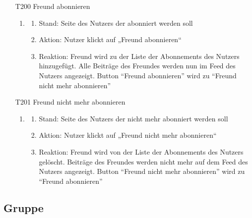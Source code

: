 \documentclass[parskip=full]{scrartcl}
\begin{document}
	\begin{itemize}
		\item[T200] Freund abonnieren
		\begin{enumerate}
			\item
			\begin{enumerate}[nosep]	
				\item Stand: Seite des Nutzers der abonniert werden soll
				\item Aktion: Nutzer klickt auf „Freund abonnieren“
				\item Reaktion: Freund wird zu der Liste der \gls{Abonnements} des Nutzers hinzugefügt. Alle Beiträge des Freundes werden nun im \gls{Feed} des Nutzers angezeigt. \gls{Button} “Freund abonnieren” wird zu “Freund nicht mehr abonnieren”
			\end{enumerate} 
		\end{enumerate}
		
		
		
		\item[T201] Freund nicht mehr abonnieren
		\begin{enumerate}
			\item
			\begin{enumerate}[nosep]	
				\item Stand: Seite des Nutzers der nicht mehr abonniert werden soll
				\item Aktion: Nutzer klickt auf „Freund nicht mehr abonnieren“
				\item Reaktion: Freund wird von der Liste der \gls{Abonnements} des Nutzers gelöscht. Beiträge des Freundes werden nicht mehr auf dem \gls{Feed} des Nutzers angezeigt. \gls{Button} “Freund nicht mehr abonnieren” wird zu “Freund abonnieren”
			\end{enumerate} 
		\end{enumerate}
	\end{itemize}
	
	
	\subsection{Gruppe}
	
\end{document}
